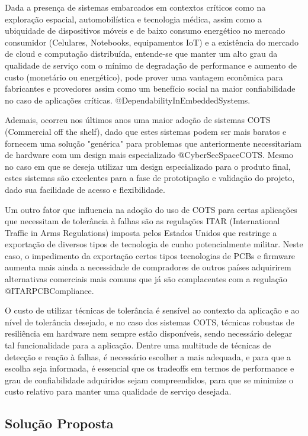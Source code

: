 Dada a presença de sistemas embarcados em contextos críticos como na exploração espacial, automobilística e tecnologia médica, assim como a ubiquidade de dispositivos móveis e de baixo consumo energético no mercado consumidor (Celulares, Notebooks, equipamentos IoT) e a existência do mercado de cloud e computação distribuída, entende-se que manter um alto grau da qualidade de serviço com o mínimo de degradação de performance e aumento de custo (monetário ou energético), pode prover uma vantagem econômica para fabricantes e provedores assim como um benefício social na maior confiabilidade no caso de aplicações críticas. @DependabilityInEmbeddedSystems.

Ademais, ocorreu nos últimos anos uma maior adoção de sistemas COTS (Commercial off the shelf), dado que estes sistemas podem ser mais baratos e fornecem uma solução "genérica" para problemas que anteriormente necessitariam de hardware com um design mais especializado @CyberSecSpaceCOTS. Mesmo no caso em que se deseja utilizar um design especializado para o produto final, estes sistemas são excelentes para a fase de prototipação e validação do projeto, dado sua facilidade de acesso e flexibilidade.

Um outro fator que influencia na adoção do uso de COTS para certas aplicações que necessitam de tolerância à falhas são as regulações ITAR (International Traffic in Arms Regulations) imposta pelos Estados Unidos que restringe a exportação de diversos tipos de tecnologia de cunho potencialmente militar. Neste caso, o impedimento da exportação certos tipos  tecnologias de PCBs e firmware aumenta mais ainda a necessidade de compradores de outros países adquirirem alternativas comerciais mais comuns que já são complacentes com a regulação @ITARPCBCompliance.

O custo de utilizar técnicas de tolerância é sensível ao contexto da aplicação e ao nível de tolerância desejado, e no caso dos sistemas COTS, técnicas robustas de resiliência em hardware nem sempre estão disponíveis, sendo necessário delegar tal funcionalidade para a aplicação. Dentre uma multitude de técnicas de detecção e reação à falhas, é necessário escolher a mais adequada, e para que a escolha seja informada, é essencial que os tradeoffs em termos de performance e grau de confiabilidade adquiridos sejam compreendidos, para que se minimize o custo relativo para manter uma qualidade de serviço desejada.

\subsection{Solução Proposta}

